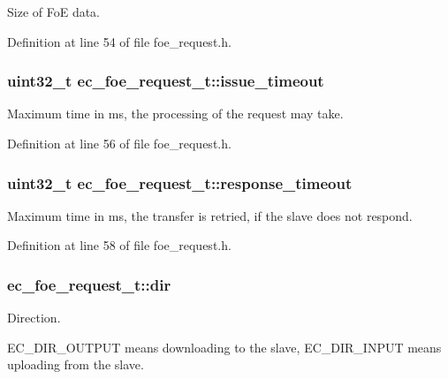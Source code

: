 \-Size of \-Fo\-E data. 



\-Definition at line 54 of file foe\-\_\-request.\-h.

\subsubsection[{issue\-\_\-timeout}]{\setlength{\rightskip}{0pt plus 5cm}uint32\-\_\-t {\bf ec\-\_\-foe\-\_\-request\-\_\-t\-::issue\-\_\-timeout}}\label{structec__foe__request__t_a313c264273fbc3dc6b7aa4a177dd1505}


\-Maximum time in ms, the processing of the request may take. 



\-Definition at line 56 of file foe\-\_\-request.\-h.

\subsubsection[{response\-\_\-timeout}]{\setlength{\rightskip}{0pt plus 5cm}uint32\-\_\-t {\bf ec\-\_\-foe\-\_\-request\-\_\-t\-::response\-\_\-timeout}}\label{structec__foe__request__t_a347a7ba58a6616319766bc65e2957ef9}


\-Maximum time in ms, the transfer is retried, if the slave does not respond. 



\-Definition at line 58 of file foe\-\_\-request.\-h.

\subsubsection[{dir}]{ {\bf ec\-\_\-foe\-\_\-request\-\_\-t\-::dir}}\label{structec__foe__request__t_a28940cc34e5ddb8a960cc459040bbcc9}


\-Direction. 

\-E\-C\-\_\-\-D\-I\-R\-\_\-\-O\-U\-T\-P\-U\-T means downloading to the slave, \-E\-C\-\_\-\-D\-I\-R\-\_\-\-I\-N\-P\-U\-T means uploading from the slave. 

